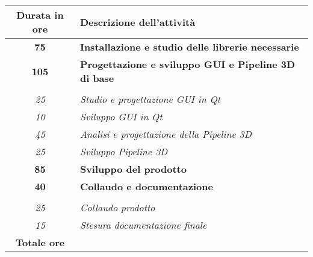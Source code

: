 

\begin{tabularx}{\textwidth}{|c|X|}
	\hline
	\textbf{Durata in ore} & \textbf{Descrizione dell'attività} \\\hline
	
	\textbf{75} & \textbf{Installazione e studio delle librerie necessarie} \\	 
    \hline
    
    \textbf{105} & \textbf{Progettazione e sviluppo GUI e Pipeline 3D di base} \\ \hdashline 
    \multirow{3}{0cm}\\ 
    \textit{25} & 
    \textit{Studio e progettazione GUI in Qt} \\
    \textit{10} & 
    \textit{Sviluppo GUI in Qt} \\
    \textit{45} & 
    \textit{Analisi e progettazione della Pipeline 3D} \\
    \textit{25} & 
    \textit{Sviluppo Pipeline 3D} \\
    \hline
    
    \textbf{85} & \textbf{Sviluppo del prodotto} \\	 
    \hline    
    
    \textbf{40} & \textbf{Collaudo e documentazione}  \\ \hdashline 
    \multirow{4}{0cm}\\ 
    \textit{25} & 
    \textit{Collaudo prodotto} \\
    \textit{15} & 
    \textit{Stesura documentazione finale} \\
    \hline
	
	\textbf{Totale ore} & \multicolumn{1}{|c|}{\textbf{\totaleOre}} \\\hline
	
	
\end{tabularx}